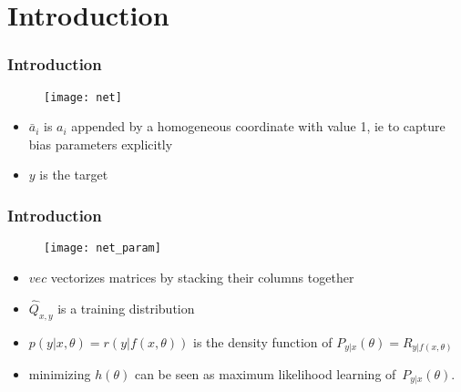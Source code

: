 \section{Introduction}

\begin{frame}
\frametitle{Introduction}

\begin{figure}
    \centering
    \texttt{[image: net]}
\end{figure}

{\footnotesize
\begin{itemize}
    \item $\bar{a}_i$ is $a_i$ appended by a homogeneous coordinate with value 1, ie
            to capture bias parameters explicitly
    \item $y$ is the target
\end{itemize}
}
\end{frame}

\begin{frame}
\frametitle{Introduction}

\begin{figure}
    \centering
    \texttt{[image: net\_param]}
\end{figure}

{\footnotesize
\begin{itemize}
    \item $vec$ vectorizes matrices by stacking their columns together
    \item $\hat{Q}_{x, y}$ is a training distribution
    \item $p(y|x, \theta) = r(y|f(x, \theta))$ is the density function of $P_{y|x}(\theta) = R_{y|f(x,\theta)}$
    \item minimizing $h(\theta)$ can be seen as maximum likelihood learning of~$P_{y|x}(\theta)$.
\end{itemize}
}

\end{frame}

